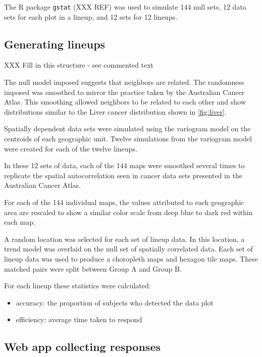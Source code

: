 \documentclass[conference,final,]{IEEEtran}
\providecommand{\tightlist}{%
  \setlength{\itemsep}{0pt}\setlength{\parskip}{0pt}}
\begin{document}
The R package \texttt{gstat} (XXX REF) was used to simulate 144 null sets, 12 data sets for each plot in a lineup, and 12 sets for 12 lineups.

\hypertarget{generating-lineups}{%
\subsection{Generating lineups}\label{generating-lineups}}

XXX Fill in this structure - see commented text

The null model imposed suggests that neighbors are related. The randomness imposed was smoothed to mirror the practice taken by the Australian Cancer Atlas. This smoothing allowed neighbors to be related to each other and show distributions similar to the Liver cancer distribution shown in \ref{fig:liver}.

Spatially dependent data sets were simulated using the variogram model on the centroids of each geographic unit. Twelve simulations from the variogram model were created for each of the twelve lineups.

In these 12 sets of data, each of the 144 maps were smoothed several times to replicate the spatial autocorrelation seen in cancer data sets presented in the Australian Cancer Atlas.

For each of the 144 individual maps, the values attributed to each geographic area are rescaled to show a similar color scale from deep blue to dark red within each map.

A random location was selected for each set of lineup data.
In this location, a trend model was overlaid on the null set of spatially correlated data.
Each set of lineup data was used to produce a choropleth maps and hexagon tile maps. These matched pairs were split between Group A and Group B.

For each lineup these statistics were calculated:

\begin{itemize}
\tightlist
\item
  accuracy: the proportion of subjects who detected the data plot
\item
  efficiency: average time taken to respond
\end{itemize}

\hypertarget{web-app-collecting-responses}{%
\subsection{Web app collecting responses}\label{web-app-collecting-responses}}
\end{document}

